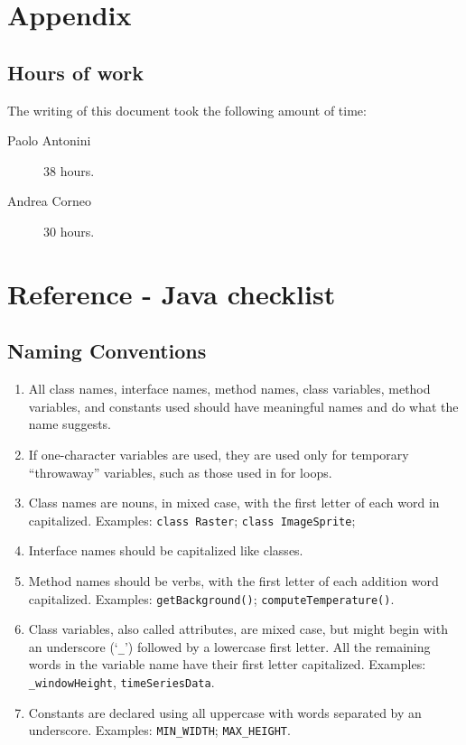 \chapter{Appendix}\label{chap:appendix}

\section{Hours of work}
The writing of this document took the following amount of time:

\begin{description}
	\item [Paolo Antonini] 38 hours.
	\item [Andrea Corneo] 30 hours.
\end{description}



\chapter{Reference - Java checklist}

\section{Naming Conventions}\begin{enumerate}
\item \label{item:1}All class names, interface names, method names, class variables, method variables, and constants used should have meaningful names and do what the name suggests.
\item \label{item:2}If one-character variables are used, they are used only for temporary ``throwaway'' variables, such as those used in for loops.
\item \label{item:3}Class names are nouns, in mixed case, with the first letter of each word in capitalized. Examples: \texttt{class Raster}; \texttt{class ImageSprite};
\item \label{item:4}Interface names should be capitalized like classes.
\item \label{item:5}Method names should be verbs, with the first letter of each addition word capitalized. Examples: \texttt{getBackground()}; \texttt{computeTemperature()}. 
\item \label{item:6}Class variables, also called attributes, are mixed case, but might begin with an underscore (`\texttt{\_}') followed by a lowercase first letter. All the remaining words in the variable name have their first letter capitalized. Examples: \texttt{\_windowHeight}, \texttt{timeSeriesData}.
\item \label{item:7}Constants are declared using all uppercase with words separated by an underscore. Examples: \texttt{MIN\_WIDTH}; \texttt{MAX\_HEIGHT}.
\end{enumerate}

